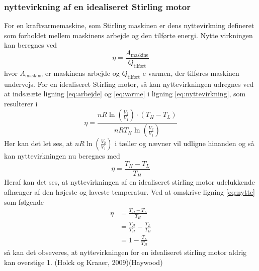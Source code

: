 \documentclass[SRC.tex]{subfiles}
\begin{document}
	\subsubsection{nyttevirkning af en idealiseret Stirling motor}
	For en kraftvarmemaskine, som Stirling maskinen er dens nyttevirkning defineret som forholdet mellem maskinens arbejde og den tilførte energi. Nytte virkningen kan beregnes ved 
	\begin{equation}
		\eta = \frac{A_{\text{maskine}}}{Q_{\text{tilført}}}
		\label{eq:nyttevirkning}
	\end{equation}
	hvor \(A_{\text{maskine}}\) er maskinens arbejde og \(Q_{\text{tilført}}\) e varmen, der tilføres maskinen undervejs. For en idealiseret Stirling motor, så kan nyttevirkningen udregnes ved at indsææte ligning \eqref{eq:arbejde} og \eqref{eq:varme} i ligning \eqref{eq:nyttevirkning}, som resulterer i
	\begin{equation}
		\eta = \frac{nR\ln\left(\frac{V_2}{V_1}\right)\cdot (T_H - T_L)}{nRT_H\ln\left(\frac{V_2}{V_1}\right)} 
	\end{equation}
	Her kan det let ses, at \(nR\ln\left(\frac{V_2}{V_1}\right)\) i tæller og nævner vil udligne hinanden og så kan nyttevirkningen nu beregnes med
	\begin{equation}
		\eta = \frac{T_H-T_L}{T_H}
		\label{eq:nytte}
	\end{equation}
	Heraf kan det ses, at nyttevirkningen af en idealiseret stirling motor udelukkende afhænger af den højeste og laveste temperatur. Ved at omskrive ligning \eqref{eq:nytte} som følgende
	\begin{subequations}
		\begin{align}
			\eta &= \frac{T_H-T_L}{T_H} \\
			 	 &= \frac{T_H}{T_H}-\frac{T_L}{T_H} \\
			 	 &= 1 -\frac{T_L}{T_H}
		\end{align}
	\end{subequations}
	så kan det obseveres, at nyttevirkningen for en idealiseret stirling motor aldrig kan overstige 1.
	(Holck og Kraaer, 2009)​(Haywood) 
\end{document}
